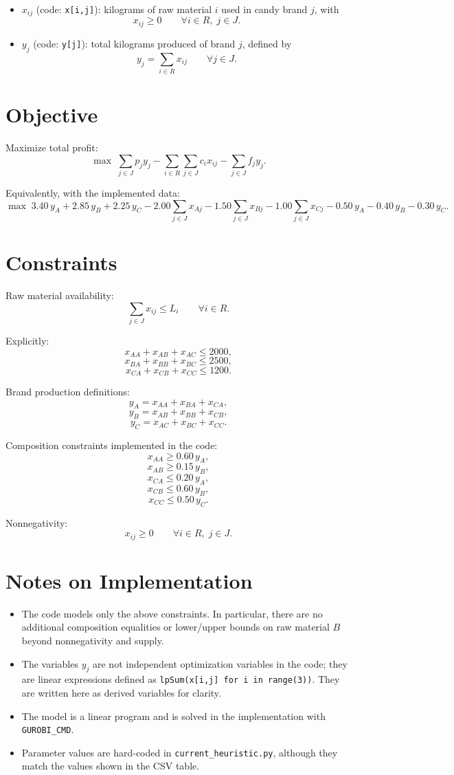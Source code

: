 \begin{itemize}
    \item $x_{ij}$ (code: \texttt{x[i,j]}): kilograms of raw material $i$ used in candy brand $j$, with
    \[
    x_{ij} \ge 0 \qquad \forall i \in R,\; j \in J.
    \]
    \item $y_j$ (code: \texttt{y[j]}): total kilograms produced of brand $j$, defined by
    \[
    y_j = \sum_{i \in R} x_{ij} \qquad \forall j \in J.
    \]
\end{itemize}

\section*{Objective}

Maximize total profit:
\[
\max \;
\sum_{j \in J} p_j y_j
-
\sum_{i \in R}\sum_{j \in J} c_i x_{ij}
-
\sum_{j \in J} f_j y_j .
\]

Equivalently, with the implemented data:
\[
\max \;
3.40\,y_A+2.85\,y_B+2.25\,y_C
-2.00\sum_{j \in J}x_{Aj}
-1.50\sum_{j \in J}x_{Bj}
-1.00\sum_{j \in J}x_{Cj}
-0.50\,y_A-0.40\,y_B-0.30\,y_C.
\]

\section*{Constraints}

Raw material availability:
\[
\sum_{j \in J} x_{ij} \le L_i \qquad \forall i \in R.
\]

Explicitly:
\[
x_{AA}+x_{AB}+x_{AC} \le 2000,
\]
\[
x_{BA}+x_{BB}+x_{BC} \le 2500,
\]
\[
x_{CA}+x_{CB}+x_{CC} \le 1200.
\]

Brand production definitions:
\[
y_A=x_{AA}+x_{BA}+x_{CA},
\]
\[
y_B=x_{AB}+x_{BB}+x_{CB},
\]
\[
y_C=x_{AC}+x_{BC}+x_{CC}.
\]

Composition constraints implemented in the code:
\[
x_{AA} \ge 0.60\, y_A,
\]
\[
x_{AB} \ge 0.15\, y_B,
\]
\[
x_{CA} \le 0.20\, y_A,
\]
\[
x_{CB} \le 0.60\, y_B,
\]
\[
x_{CC} \le 0.50\, y_C.
\]

Nonnegativity:
\[
x_{ij} \ge 0 \qquad \forall i \in R,\; j \in J.
\]

\section*{Notes on Implementation}

\begin{itemize}
    \item The code models only the above constraints. In particular, there are no additional composition equalities or lower/upper bounds on raw material $B$ beyond nonnegativity and supply.
    \item The variables $y_j$ are not independent optimization variables in the code; they are linear expressions defined as \texttt{lpSum(x[i,j] for i in range(3))}. They are written here as derived variables for clarity.
    \item The model is a linear program and is solved in the implementation with \texttt{GUROBI\_CMD}.
    \item Parameter values are hard-coded in \texttt{current\_heuristic.py}, although they match the values shown in the CSV table.
\end{itemize}
